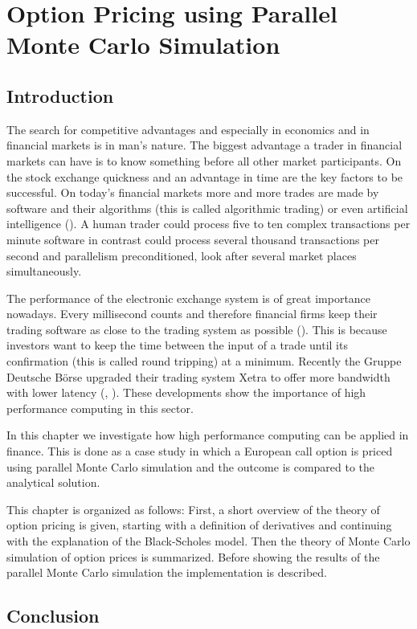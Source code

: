 \chapter[Parallel Monte Carlo Simulation]{Option Pricing using
  Parallel Monte Carlo Simulation}
\label{chap:options}
\section{Introduction}
\label{sec:optionintro}

The search for competitive advantages and especially in economics and in
financial markets is in man's nature. The biggest advantage a trader
in financial markets can have is to know something before all
other market participants. On the stock exchange quickness and an advantage
in time are the key factors to be successful. On today's financial
markets more and more trades are made by software and their
algorithms (this is called algorithmic trading) or even artificial
intelligence (\cite{bloomberg:hal9000}). A human trader could
process five to ten complex 
transactions per minute software in contrast could process several
thousand transactions per second and parallelism preconditioned, look
after several market places simultaneously.


The performance of the electronic exchange system is of great
importance nowadays. Every millisecond counts and therefore financial
firms keep their trading software as close to the trading system as
possible (\cite{wstonline:cuttingedge}). This is because investors
want to keep the time
between the input of a trade until its confirmation (this is called
round tripping) at a minimum. Recently the Gruppe Deutsche B\"orse
upgraded their trading 
system Xetra to offer more bandwidth with lower latency (\cite{gdb:latency},
\cite{gdb:bandwidth}).
These developments show the importance of high performance computing
in this sector.


In this chapter we investigate how high performance computing can be
applied in finance. This is done as a case study in which a
European call option is priced using parallel Monte Carlo
simulation and the outcome is compared to the analytical solution.

This chapter is organized as follows: First, a short overview of the
theory of option pricing is given, starting with a definition of
derivatives and continuing with the explanation of the Black-Scholes
model. Then the theory of Monte Carlo simulation of option prices is
summarized. Before showing the results of the parallel Monte Carlo
simulation the implementation is described.




\section{Conclusion}

